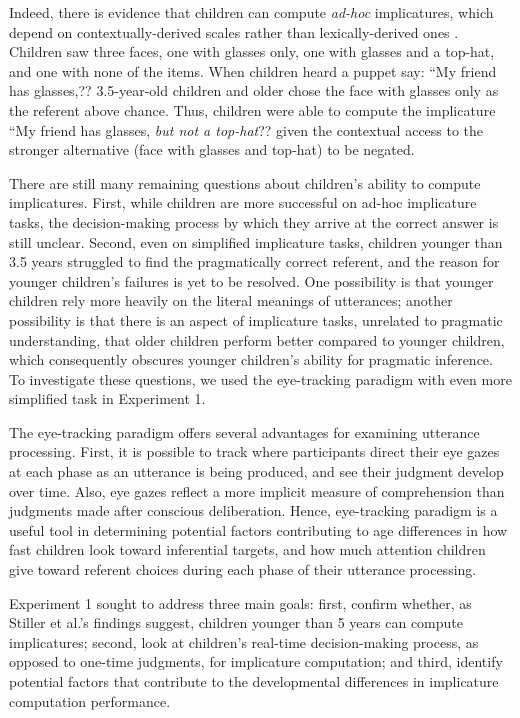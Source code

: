 \documentclass[10pt,letterpaper]{article}
\begin{document}
Indeed, there is evidence that children can compute \emph{ad-hoc} implicatures, which depend on contextually-derived scales rather than lexically-derived ones \cite{stillerLLD}. Children saw three faces, one with glasses only, one with glasses and a top-hat, and one with none of the items. When children heard a puppet say: ``My friend has glasses,?? 3.5-year-old children and older chose the face with glasses only as the referent above chance. Thus, children were able to compute the implicature ``My friend has glasses, \emph{but not a top-hat}?? given the contextual access to the stronger alternative (face with glasses and top-hat) to be negated. 

There are still many remaining questions about children's ability to compute implicatures. First, while children are more successful on ad-hoc implicature tasks, the decision-making process by which they arrive at the correct answer is still unclear. Second, even on simplified implicature tasks, children younger than 3.5 years struggled to find the pragmatically correct referent, and the reason for younger children's failures is yet to be resolved. One possibility is that younger children rely more heavily on the literal meanings of utterances; another possibility is that there is an aspect of implicature tasks, unrelated to pragmatic understanding, that older children perform better compared to younger children, which consequently obscures younger children's ability for pragmatic inference. To investigate these questions, we used the eye-tracking paradigm with even more simplified task in Experiment 1.

The eye-tracking paradigm offers several advantages for examining utterance processing. First, it is possible to track where participants direct their eye gazes at each phase as an utterance is being produced, and see their judgment develop over time. Also, eye gazes reflect a more implicit measure of comprehension than judgments made after conscious deliberation. Hence, eye-tracking paradigm is a useful tool in determining potential factors contributing to age differences in how fast children look toward inferential targets, and how much attention children give toward referent choices during each phase of their utterance processing.

Experiment 1 sought to address three main goals: first, confirm whether, as Stiller et al.'s findings suggest, children younger than 5 years can compute implicatures; second, look at children's real-time decision-making process, as opposed to one-time judgments, for implicature computation; and third, identify potential factors that contribute to the developmental differences in implicature computation performance.
\end{document}
